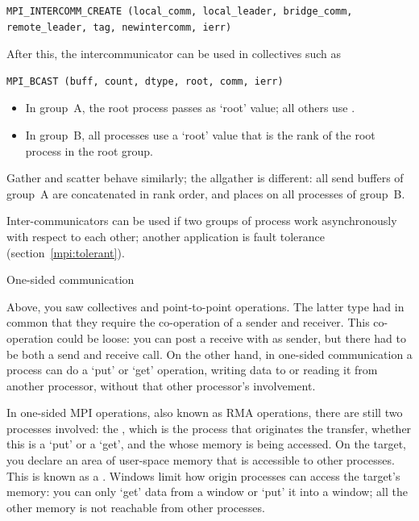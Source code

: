 \begin{verbatim}
MPI_INTERCOMM_CREATE (local_comm, local_leader, bridge_comm, remote_leader, tag, newintercomm, ierr)
\end{verbatim}
After this, the intercommunicator can be used in collectives such as
\begin{verbatim}
MPI_BCAST (buff, count, dtype, root, comm, ierr)
\end{verbatim}
\begin{itemize}
\item In group~A, the root process passes  as
  `root' value; all others use .
\item In group~B, all processes use a `root' value that is the
  rank of the root process in the root group.
\end{itemize}
Gather and scatter behave similarly; the allgather is different: all
send buffers of group~A are concatenated in rank order, and places on
all processes of group~B.

Inter-communicators can be used if two groups of process work
asynchronously with respect to each other; another application is
fault tolerance (section~\ref{mpi:tolerant}).

 {One-sided communication}

Above, you saw collectives and point-to-point operations. The latter
type had in common that they require the co-operation of a sender and
receiver. This co-operation could be loose: you can post a receive
with  as sender, but there had to be both a send and
receive call. On the other hand, in one-sided communication a process
can do a `put' or `get' operation, writing data to or reading it from
another processor, without that other processor's involvement.

In one-sided MPI operations, also known as \acf{RMA} operations, there
are still two processes involved: the , which is the
process that originates the transfer, whether this is a `put' or a `get',
and the  whose
memory is being accessed. On the target, you declare an area of
user-space memory that is accessible to other processes. This is known
as a . Windows limit how origin processes can access
the target's memory: you can only `get' data from a window or `put' it
into a window; all the other memory is not reachable from other processes.

